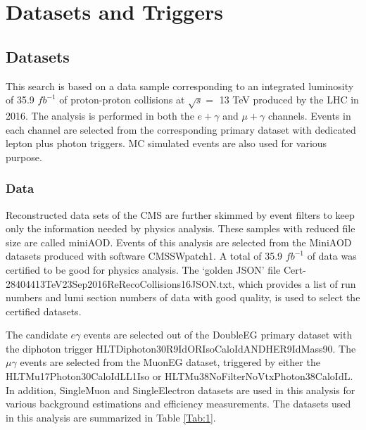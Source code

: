 \documentclass[thesis.tex]{subfiles}
\renewcommand\_{\textunderscore\allowbreak}
\begin{document}
\chapter{Datasets and Triggers}
\label{sec:datasets}

\section{Datasets}
\label{subsec:dataandsimulation}
This search is based on a data sample corresponding to an integrated luminosity of 35.9 $fb^{-1}$ of proton-proton collisions at $\sqrt{s} =$ 13 TeV produced by the LHC in 2016.
The analysis is performed in both the $e + \gamma$ and $\mu + \gamma$ channels. 
Events in each channel  are selected from the corresponding primary dataset with dedicated lepton plus photon triggers.
MC simulated events are also used for various purpose.  

\subsection{Data}
Reconstructed data sets of the CMS are further skimmed by event filters to keep only the information needed by physics analysis. 
These samples with reduced file size are called miniAOD. 
Events of this analysis are selected from the MiniAOD datasets produced with software CMSSW\_8\_0\_26\_patch1.
A total of 35.9 $fb^{-1}$ of data was certified to be good for physics analysis. The `golden JSON' file 
Cert\_271036-284044\_13TeV\_23Sep2016ReReco\_Collisions16\_JSON.txt, which provides a list of run numbers and lumi section numbers of data with good quality, is used to select the certified datasets. 

The candidate $e\gamma$ events are selected out of the DoubleEG primary dataset with the diphoton trigger HLT\_Diphoton30\_18\_R9Id\_OR\_IsoCaloId\_AND\_HE\_R9Id\_Mass90. 
The $\mu\gamma$ events are selected from the MuonEG dataset, triggered by either the HLT\_Mu17\_Photon30\_CaloIdL\_L1Iso or HLT\_Mu38NoFilterNoVtx\_Photon38\_CaloIdL. 
In addition, SingleMuon and SingleElectron datasets are used in this analysis for various background estimations and efficiency measurements. 
The datasets used in this analysis are summarized in Table \ref{Tab:1}. \\
\end{document}
